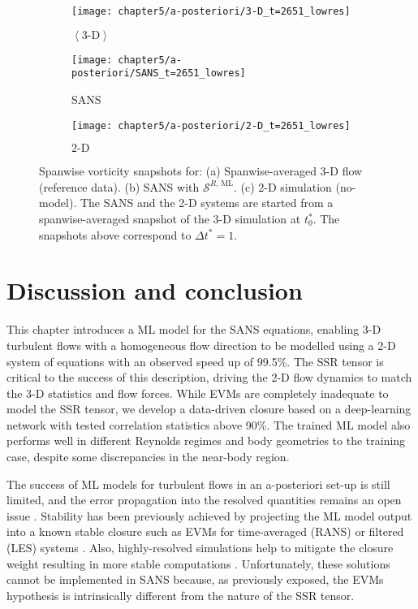 \documentclass[../main.tex]{subfiles}
\begin{document}
\begin{figure}[t]
\centering
\begin{subfigure}[t]{0.7\linewidth}
 	\texttt{[image: chapter5/a-posteriori/3-D\_t=2651\_lowres]}
 	\caption{$\left\langle 3\text{-}\mathrm{D} \right\rangle$}
\end{subfigure}
\begin{subfigure}[t]{0.7\linewidth}
	\texttt{[image: chapter5/a-posteriori/SANS\_t=2651\_lowres]}
	\caption{SANS}
\end{subfigure}
\begin{subfigure}[t]{0.7\linewidth}
	\texttt{[image: chapter5/a-posteriori/2-D\_t=2651\_lowres]}
	\caption{$2\text{-}\mathrm{D}$}
\end{subfigure}
\caption{Spanwise vorticity snapshots for: (a) Spanwise-averaged 3-D flow (reference data).
(b) SANS with $\mathcal{S}^{R,\,\mathrm{ML}}$.
(c) 2-D simulation (no-model).
The SANS and the 2-D systems are started from a spanwise-averaged snapshot of the 3-D simulation at $t^*_0$.
The snapshots above correspond to $\Delta t^*=1$.}
\label{fig:ML_a-posteriori}
\end{figure}

\section{Discussion and conclusion}

This chapter introduces a ML model for the SANS equations, enabling 3-D turbulent flows with a homogeneous flow direction to be modelled using a 2-D system of equations with an observed speed up of 99.5\%.
The SSR tensor is critical to the success of this description, driving the 2-D flow dynamics to match the 3-D statistics and flow forces.
While EVMs are completely inadequate to model the SSR tensor, we develop a data-driven closure based on a deep-learning network with tested correlation statistics above 90\%.
The trained ML model also performs well in different Reynolds regimes and body geometries to the training case, despite some discrepancies in the near-body region.

The success of ML models for turbulent flows in an a-posteriori set-up is still limited, and the error propagation into the resolved quantities remains an open issue \citep{Wang2017, Beck2019}.
Stability has been previously achieved by projecting the ML model output into a known stable closure such as EVMs for time-averaged (RANS) or filtered (LES) systems \citep{Maulik2018, Beck2019, Cruz2019}.
Also, highly-resolved simulations help to mitigate the closure weight resulting in more stable computations \citep{Gamahara2017}.
Unfortunately, these solutions cannot be implemented in SANS because, as previously exposed, the EVMs hypothesis is intrinsically different from the nature of the SSR tensor.
\end{document}
